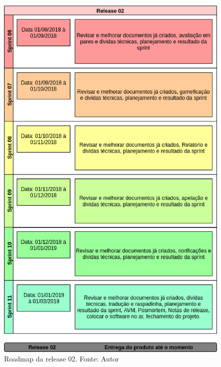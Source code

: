 \begin{apendicesenv}
\begin{figure}[h!]
	\centering
  \includegraphics[keepaspectratio=true,scale=0.8]{figuras/roadmap2.eps}
  \caption[Roadmap da release 02]{Roadmap da release 02. Fonte: Autor}
	\label{fig:roadmap2}
\end{figure}

\end{apendicesenv}
